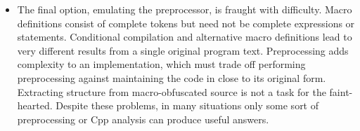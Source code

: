 \documentclass[10pt]{article}
\begin{document}
\begin{itemize}
  


\item The final option, emulating the preprocessor, is fraught with
  difficulty.  Macro definitions consist of complete tokens but need not be
  complete expressions or statements.  Conditional compilation and
  alternative macro definitions lead to very different results from a
  single original program text.  Preprocessing adds complexity to an
  implementation, which must trade off performing preprocessing against
  maintaining the code in close to its original form.  Extracting structure
  from macro-obfuscated source is not a task for the faint-hearted.
  Despite these problems, in many situations only some sort of
  preprocessing or Cpp analysis can produce useful answers.

\end{itemize}

\end{document}
